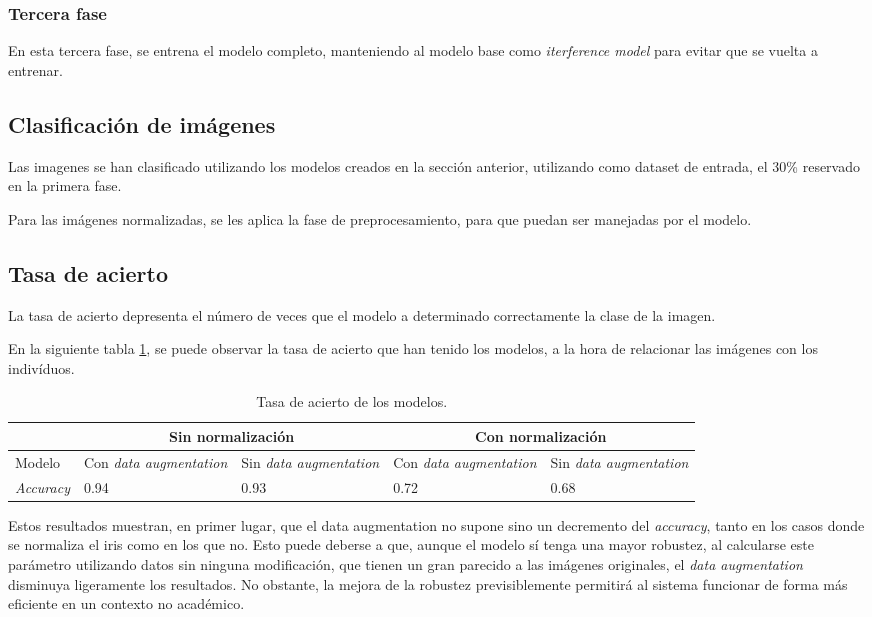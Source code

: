 \subsubsection{Tercera fase}

En esta tercera fase, se entrena el modelo completo, manteniendo al modelo base como \textit{iterference model} para evitar que se vuelta a entrenar.


\subsection{Clasificación de imágenes}

Las imagenes se han clasificado utilizando los modelos creados en la sección anterior, utilizando como dataset de entrada, el 30\% reservado en la primera fase. 

Para las imágenes normalizadas, se les aplica la fase de preprocesamiento, para que puedan ser manejadas por el modelo. 

\subsection{Tasa de acierto} 

La tasa de acierto depresenta el número de veces que el modelo a determinado correctamente la clase de la imagen. 

En la siguiente tabla \ref{tabla:tasa-acierto-modelos}, se puede observar la tasa de acierto que han tenido los modelos, a la hora de relacionar las imágenes
 con los indivíduos.

\begin{table}[h!]
\begin{tabular}{ |p{2cm}||p{2cm}|p{2cm}|p{2cm}|p{2cm}|  }
    \hline
     & \multicolumn{2}{|c|}{Sin normalización} & \multicolumn{2}{|c|}{Con normalización} \\
    \hline
    Modelo& Con \textit{data augmentation} & Sin \textit{data augmentation} &Con \textit{data augmentation}&Sin \textit{data augmentation}\\
    \hline
    \textit{Accuracy} & 0.94   & 0.93    & 0.72 &   0.68\\
    \hline
   \end{tabular}
   \caption{\label{tabla:tasa-acierto-modelos}Tasa de acierto de los modelos.}
\end{table}


Estos resultados muestran, en primer lugar, que el data augmentation no supone sino un decremento del \textit{accuracy}, tanto en los casos donde se normaliza el iris
como en los que no. Esto puede deberse a que, aunque el modelo sí tenga una mayor robustez, al calcularse este parámetro utilizando datos sin ninguna modificación, que 
tienen un gran parecido a las imágenes originales, el \textit{data augmentation} disminuya ligeramente los resultados. No obstante, la mejora de la robustez previsiblemente
permitirá al sistema funcionar de forma más eficiente en un contexto no académico.

